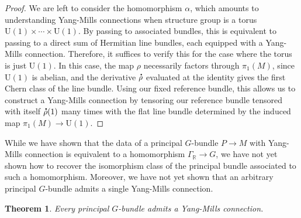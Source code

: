 \documentclass[psamsfonts, 12pt]{amsart}
\newtheorem{thm}{Theorem}[section]
\theoremstyle{definition}
\theoremstyle{remark}
\newcommand{\R}{\mathbb{R}}
\newcommand*{\dt}[1]{%
   \accentset{\mbox{\large\bfseries .}}{#1}}
\begin{document}
\begin{proof}
We are left to consider the homomorphism $\alpha$, which amounts to understanding
Yang-Mills connections when structure group is a torus
$\mathrm{U}(1) \times \cdots \times \mathrm{U}(1)$. By passing to associated bundles,
this is equivalent to passing to a direct sum of Hermitian line bundles, each equipped
with a Yang-Mills connection. Therefore, it suffices to verify this for the case where
the torus is just $\mathrm{U}(1)$. In this case, the map $\rho$ necessarily factors
through $\pi_1(M)$, since $\mathrm{U}(1)$ is abelian, and the derivative $\dt{\rho}$
evaluated at the identity gives the first Chern class of the line bundle. Using our
fixed reference bundle, this allows us to construct a Yang-Mills connection by
tensoring our reference bundle tensored with itself $\dt{\rho}(1)$ many times with the
flat line bundle determined by the induced map $\pi_1(M) \to \mathrm{U}(1)$.
\end{proof}
%
While we have shown that the data of a principal $G$-bundle $P \to M$ with
Yang-Mills connection is equivalent to a homomorphism $\Gamma_\R \to G$, we have
not yet shown how to recover the isomorphism class of the principal bundle associated
to such a homomorphism. Moreover, we have not yet shown that an arbitrary
principal $G$-bundle admits a single Yang-Mills connection.
%
\begin{thm}
Every principal $G$-bundle admits a Yang-Mills connection.
\end{thm}
%
\end{document}
